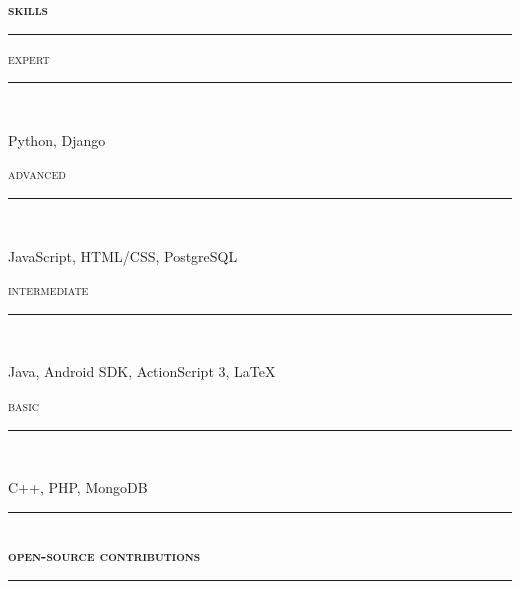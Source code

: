 \documentclass[a4paper,12pt]{letter}
\begin{document}
\begin{minipage}[t]{95mm}
	\large{\textsc{\textbf{skills}}}\\
	\rule[3mm]{\linewidth}{1mm}
	
	\vspace{-2mm}
	\large{\textsc{expert}}\par
	\rule[4mm]{\linewidth}{0.25mm}\\
	\vspace{-12mm}

	\LARGE{Python, Django}
	
	\vspace{2mm}
	\large{\textsc{advanced}}\par
	\rule[4mm]{\linewidth}{0.25mm}\\
	\vspace{-11.5mm}
	
	\Large{JavaScript, HTML/CSS, PostgreSQL}
	
	\vspace{2mm}
	\large{\textsc{intermediate}}\par
	\rule[4mm]{\linewidth}{0.25mm}\\
	\vspace{-10.5mm}
	
	\large{Java, Android SDK, ActionScript 3, \LaTeX{}}
	
	\vspace{2mm}
	\large{\textsc{basic}}\par
	\rule[4mm]{\linewidth}{0.25mm}\\
	\vspace{-10mm}
	
	\normalsize{C++, PHP, MongoDB}
	
	\vspace{4mm}
	\rule[3mm]{\linewidth}{1mm}
	\vspace{-11mm}\\
	\large{\textsc{\textbf{open-source contributions}}}\\
	\rule[3mm]{\linewidth}{1mm}
	
	
\end{minipage}
\end{document}
